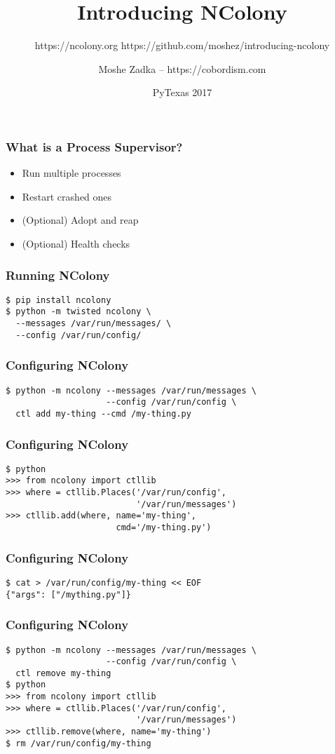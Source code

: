 \documentclass{beamer}
\title{Introducing NColony}
\subtitle{https://ncolony.org https://github.com/moshez/introducing-ncolony}
\author{Moshe Zadka -- https://cobordism.com}
\date{PyTexas 2017}
\begin{document}
 
\frame{\titlepage}

\begin{frame}
\frametitle{What is a Process Supervisor?}
\begin{itemize}
\item Run multiple processes \pause
\item Restart crashed ones \pause
\item (Optional) Adopt and reap \pause
\item (Optional) Health checks
\end{itemize}
\end{frame}

\begin{frame}[fragile]
\frametitle{Running NColony}
\begin{lstlisting}
$ pip install ncolony
$ python -m twisted ncolony \
  --messages /var/run/messages/ \
  --config /var/run/config/
\end{lstlisting}
\end{frame}

\begin{frame}[fragile]
\frametitle{Configuring NColony}
\begin{lstlisting}
$ python -m ncolony --messages /var/run/messages \
                    --config /var/run/config \
  ctl add my-thing --cmd /my-thing.py
\end{lstlisting}
\end{frame}

\begin{frame}[fragile]
\frametitle{Configuring NColony}
\begin{lstlisting}
$ python
>>> from ncolony import ctllib
>>> where = ctllib.Places('/var/run/config',
                          '/var/run/messages')
>>> ctllib.add(where, name='my-thing',
                      cmd='/my-thing.py')
\end{lstlisting}
\end{frame}

\begin{frame}[fragile]
\frametitle{Configuring NColony}
\begin{lstlisting}
$ cat > /var/run/config/my-thing << EOF
{"args": ["/mything.py"]}
\end{lstlisting}
\end{frame}

\begin{frame}[fragile]
\frametitle{Configuring NColony}
\begin{lstlisting}
$ python -m ncolony --messages /var/run/messages \
                    --config /var/run/config \
  ctl remove my-thing
$ python
>>> from ncolony import ctllib
>>> where = ctllib.Places('/var/run/config',
                          '/var/run/messages')
>>> ctllib.remove(where, name='my-thing')
$ rm /var/run/config/my-thing
\end{lstlisting}
\end{frame}
\end{document}
